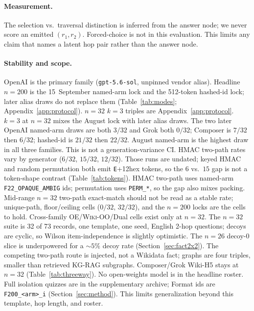 \documentclass{article}
\begin{document}
\paragraph{Measurement.}
The selection vs.\ traversal distinction is inferred from the answer node;
we never score an emitted $(r_1,r_2)$.
Forced-choice is not in this evaluation.
This limits any claim that names a latent hop pair rather than the
answer node.

\paragraph{Stability and scope.}
OpenAI is the primary family (\texttt{gpt-5.6-sol}, unpinned vendor alias).
Headline $n{=}200$ is the 15~September named-arm lock and the 512-token
hashed-id lock; later alias draws do not replace them
(Table~\ref{tab:modes}; Appendix~\ref{app:protocol}).
$n{=}32$ $k{=}3$ triples are Appendix~\ref{app:protocol}.
$k{=}3$ at $n{=}32$ mixes the August lock with later alias draws.
The two later OpenAI named-arm draws are both $3/32$ and Grok both
$0/32$; Composer is $7/32$ then $6/32$; hashed-id is $21/32$ then
$22/32$.
August named-arm is the highest draw in all three families.
This is not a generation-variance CI.
HMAC two-path rates vary by generator ($6/32$, $15/32$, $12/32$).
Those runs are undated; keyed HMAC and random permutation both emit
\texttt{E}+12hex tokens, so the $6$ vs.\ $15$ gap is not a token-shape
contrast (Table~\ref{tab:tokens}).
HMAC two-path uses named-arm \texttt{F22\_OPAQUE\_AMBIG} ids; permutation
uses \texttt{PERM\_*}, so the gap also mixes packing.
Mid-range $n{=}32$ two-path exact-match should not be read as a stable
rate; unique-path, floor/ceiling cells ($0/32$, $32/32$), and the
$n{=}200$ locks are the cells to hold.
Cross-family OE/\textsc{Wiki-OO}/Dual cells exist only at $n{=}32$.
The $n{=}32$ suite is 32 of 73 records, one template, one seed, English
2-hop questions; decoys are cyclic, so Wilson item-independence is
slightly optimistic.
The $n{=}26$ decoy-$0$ slice is underpowered for a ${\sim}5\%$ decoy rate
(Section~\ref{sec:fact2x2}).
The competing two-path route is injected, not a Wikidata fact; graphs are
four triples, smaller than retrieved KG-RAG subgraphs.
Composer/Grok Wiki-H5 stays at $n{=}32$ (Table~\ref{tab:threeway}).
No open-weights model is in the headline roster.
Full isolation quizzes are in the supplementary archive; Format ids are
\texttt{F200\_<arm>\_i}
(Section~\ref{sec:method}).
This limits generalization beyond this template, hop length, and roster.
\end{document}

